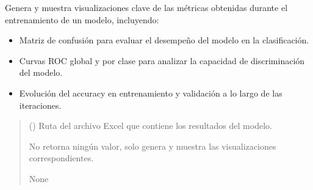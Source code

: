 \documentclass[letterpaper,10pt,spanish]{sphinxmanual}
\begin{document}
\begin{fulllineitems}
\label{\detokenize{Funciones_Visualizacion:leer_metricas.plot_metrics}}
\pysigstartsignatures
\pysiglinewithargsret
{}
{}
{}
\pysigstopsignatures
\sphinxAtStartPar
Genera y muestra visualizaciones clave de las métricas obtenidas durante el entrenamiento de un modelo, incluyendo:
\begin{itemize}
\item {} 
\sphinxAtStartPar
Matriz de confusión para evaluar el desempeño del modelo en la clasificación.

\item {} 
\sphinxAtStartPar
Curvas ROC global y por clase para analizar la capacidad de discriminación del modelo.

\item {} 
\sphinxAtStartPar
Evolución del accuracy en entrenamiento y validación a lo largo de las iteraciones.

\end{itemize}
\begin{quote}\begin{description}
\sphinxAtStartPar
{} () \textendash{} Ruta del archivo Excel que contiene los resultados del modelo.

\sphinxAtStartPar
No retorna ningún valor, solo genera y muestra las visualizaciones correspondientes.

\sphinxAtStartPar
None

\end{description}\end{quote}

\end{fulllineitems}

\end{document}
